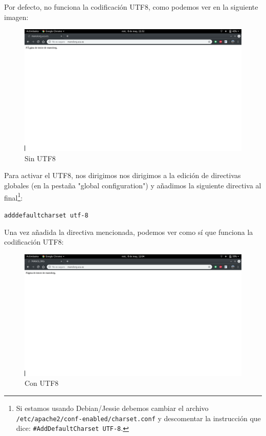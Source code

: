 \documentclass[12pt,letterpaper]{article}
\begin{document}
Por defecto, no funciona la codificación UTF8, como podemos ver en la siguiente imagen:
\newpage
\begin{figure}[h]
	\centering
	\includegraphics[scale=0.34]{SinUTF8.png}
	\caption{Sin UTF8}
	\label{Sin UTF8}
\end{figure}

Para activar el UTF8, nos dirigimos nos dirigimos a la edición de directivas globales (en la pestaña "global configuration") y añadimos la siguiente directiva al final\footnote{Si estamos usando Debian/Jessie debemos cambiar el archivo \texttt{/etc/apache2/conf-enabled/charset.conf} y descomentar la instrucción que dice: \texttt{\#AddDefaultCharset UTF-8}.}:
\begin{center}
	\texttt{adddefaultcharset utf-8}
\end{center}

\newpage
Una vez añadida la directiva mencionada, podemos ver como sí que funciona la codificación UTF8:
\begin{figure}[h]
	\centering
	\includegraphics[scale=0.34]{ConUTF8.png}
	\caption{Con UTF8}
	\label{Con UTF8}
\end{figure}
\end{document}
